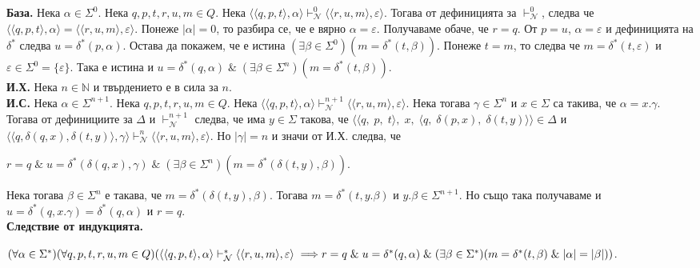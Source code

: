\documentclass[12pt]{article}
\begin{document}
\textbf{База.}
Нека \(\alpha \in \Sigma^0\). Нека \(q, p, t, r, u, m \in Q\). Нека \(\langle \langle q, p, t \rangle, \alpha \rangle \vdash_{\mathcal N}^0  \langle \langle r, u, m \rangle, \varepsilon \rangle\).
Тогава от дефиницията за \(\vdash_{\mathcal N}^0\), следва че
\(\langle \langle q, p, t \rangle, \alpha \rangle = \langle \langle r, u, m \rangle, \varepsilon \rangle\). Понеже \(|\alpha| = 0\), то разбира се, че е вярно \(\alpha = \varepsilon\).
Получаваме обаче, че \(r = q\).
От \(p = u\), \(\alpha = \varepsilon\) и дефиницията на \(\delta^*\) следва \(u = \delta^*(p, \alpha)\). 
Остава да покажем, че е истина \((\exists \beta \in \Sigma^0)(m = \delta^*(t, \beta))\).
Понеже \(t = m\), то следва че \(m = \delta^*(t, \varepsilon)\) и \(\varepsilon \in \Sigma^0 = \{\varepsilon\}\). Така е истина и \(u = \delta^*(q, \alpha) \;\&\; (\exists \beta \in \Sigma^n)(m = \delta^*(t, \beta))\). \\

\textbf{И.Х.}
Нека \(n \in \mathbb N\) и твърдението е в сила за \(n\). \\

\textbf{И.С.}
Нека \(\alpha \in \Sigma^{n + 1}\). Нека \(q, p, t, r, u, m \in Q\). Нека \(\langle \langle q, p, t \rangle, \alpha \rangle \vdash_{\mathcal N}^{n + 1}  \langle \langle r, u, m \rangle, \varepsilon \rangle\).
Нека тогава \(\gamma \in \Sigma^n\) и \(x \in \Sigma\) са такива, че \(\alpha = x.\gamma\).
Тогава от дефинициите за \(\Delta\) и \(\vdash_{\mathcal N}^{n + 1}\) следва, че
има \(y \in \Sigma\) такова, че \(\langle \langle q,\; p,\; t \rangle,\; x,\; \langle q,\; \delta(p, x),\; \delta(t, y) \rangle \rangle \in \Delta\) и \(\langle \langle q, \delta(q, x), \delta(t, y) \rangle, \gamma \rangle \vdash_{\mathcal N}^n  \langle \langle r, u, m \rangle, \varepsilon \rangle\).
Но \(|\gamma| = n\) и значи от И.Х. следва, че

\(r = q \;\&\; u = \delta^*(\delta(q, x), \gamma) \;\&\; (\exists \beta \in \Sigma^n)(m = \delta^*(\delta(t, y), \beta))\).

Нека тогава \(\beta \in \Sigma^n\) е такава, че \(m = \delta^*(\delta(t, y), \beta)\).
Тогава \(m = \delta^*(t, y.\beta)\) и \(y.\beta \in \Sigma^{n + 1}\).
Но също така получаваме и \(u = \delta^*(q, x.\gamma) = \delta^*(q, \alpha)\) и \(r = q\). \\

\textbf{Следствие от индукцията.}

\((\forall \alpha \in \Sigma^*)(\forall q, p, t, r, u, m \in Q)(
    \langle \langle q, p, t \rangle, \alpha \rangle \vdash_{\mathcal N}^*  \langle \langle r, u, m \rangle, \varepsilon \rangle \implies \\ r = q \;\&\; u = \delta^*(q, \alpha) \;\&\; (\exists \beta \in \Sigma^*)(m = \delta^*(t, \beta) \;\&\; |\alpha| = |\beta|)
)\). \\
\end{document}
